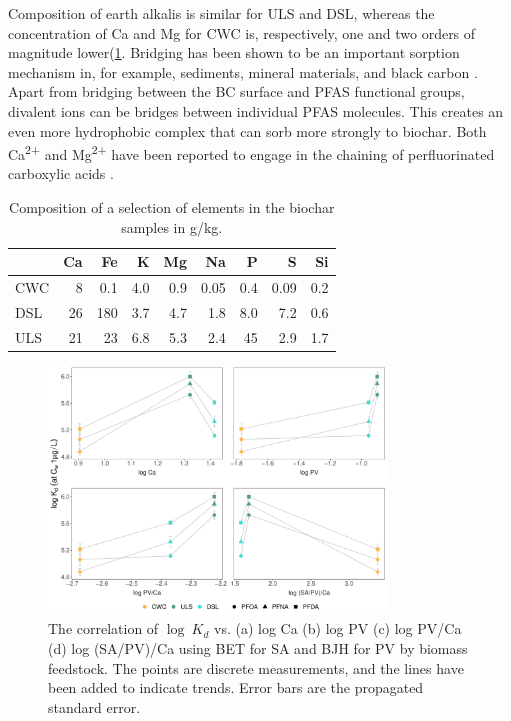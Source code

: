 Composition of earth alkalis is similar for ULS and DSL, whereas the concentration of Ca and Mg for CWC is, respectively, one and two orders of magnitude lower(\cref{tab:BC_mainElements}. Bridging has been shown to be an important sorption mechanism in, for example, sediments, mineral materials, and black carbon \citep{higgins2006sorption}. Apart from bridging between the BC surface and PFAS functional groups, divalent ions can be bridges between individual PFAS molecules. This creates an even more hydrophobic complex that can sorb more strongly to biochar. Both Ca\textsuperscript{2+} and Mg\textsuperscript{2+} have been reported to engage in the chaining of perfluorinated carboxylic acids \citep{wang2011}.


\begin{table}
\centering
\caption{Composition of a selection of elements in the biochar samples in g/kg.}
\label{tab:BC_mainElements}
\begin{tabular}{lrrrrrrrr} \toprule
 & Ca & Fe & K & Mg & Na & P & S & Si \\ \midrule
CWC & 8 & 0.1 & 4.0 & 0.9 & 0.05 & 0.4 & 0.09 & 0.2 \\
DSL & 26 & 180 & 3.7 & 4.7 & 1.8 & 8.0 & 7.2 & 0.6 \\
ULS & 21 & 23 & 6.8 & 5.3 & 2.4 & 45 & 2.9 & 1.7 \\ \bottomrule
\end{tabular}
\end{table}

\begin{figure}[htb]
    \centering
    \includegraphics[width=0.8\textwidth]{R/figs/Correlation_SAPV_Ca_plot.pdf}
    \caption{The correlation of $\log~K_d$ vs. (a) log Ca (b) log PV (c) log PV/Ca (d) log (SA/PV)/Ca using BET for SA and BJH for PV by biomass feedstock. The points are discrete measurements, and the lines have been added to indicate trends. Error bars are the propagated standard error.}
    \label{fig:Kd_SAPV_Ca}
\end{figure}

